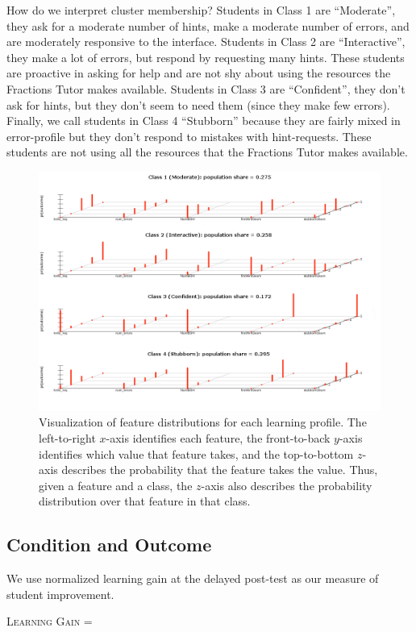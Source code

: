 \documentclass{edm_template}
\begin{document}
How do we interpret cluster membership? Students in Class 1 are ``Moderate'', they ask for a moderate number of hints, make a moderate number of errors, and are moderately responsive to the interface. Students in Class 2 are ``Interactive'', they make a lot of errors, but respond by requesting many hints. These students are proactive in asking for help and are not shy about using the resources the Fractions Tutor makes available. Students in Class 3 are ``Confident'', they don't ask for hints, but they don't seem to need them (since they make few errors). Finally, we call students in Class 4 ``Stubborn'' because they are fairly mixed in error-profile but they don't respond to mistakes with hint-requests. These students are not using all the resources that the Fractions Tutor makes available.

\begin{figure}[t]
\centering
\includegraphics[scale=0.5]{lca-class-viz.png}
\caption{Visualization of feature distributions for each learning profile. The left-to-right $x$-axis identifies each feature, the front-to-back $y$-axis identifies which value that feature takes, and the top-to-bottom $z$-axis describes the probability that the feature takes the value. Thus, given a feature and a class, the $z$-axis also describes the probability distribution over that feature in that class.}
\label{fig:LCA-class-viz}
\end{figure}


\subsection{Condition and Outcome} 
We use normalized learning gain at the delayed post-test as our measure of student improvement. 
\begin{center}
\textsc{Learning Gain} = 
\end{center}
\end{document}
